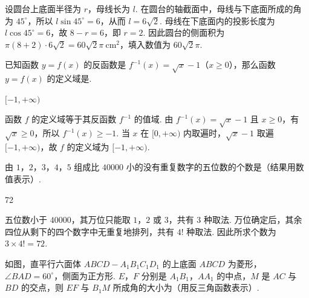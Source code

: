 \documentclass[UTF8,a4paper,oneside,11pt]{ctexbook}
\begin{document}
\begin{solution}
设圆台上底面半径为 \(r\)，母线长为 \(l\). 在圆台的轴截面中，母线与下底面所成的角为 \(45^\circ\)，所以 \(l\sin45^\circ=6\)，从而 \(l=6\sqrt{2}\). 母线在下底面内的投影长度为 \(l\cos45^\circ=6\)，故 \(8-r=6\)，即 \(r=2\). 因此圆台的侧面积为 \(\pi(8+2)\cdot6\sqrt{2}=60\sqrt{2}\pi\ \mathrm{cm}^2\)，填入数值为 \(60\sqrt{2}\pi\).
\end{solution}

\begin{problem}
已知函数 \(y = f(x)\) 的反函数是 \(f^{-1}(x)=\sqrt{x}-1\)（\(x \geqslant 0\)），那么函数 \(y = f(x)\) 的定义域是\fillinblank{}.
\end{problem}

\begin{answer}
\([-1,+\infty)\)
\end{answer}

\begin{solution}
函数 \(f\) 的定义域等于其反函数 \(f^{-1}\) 的值域. 由 \(f^{-1}(x)=\sqrt{x}-1\) 且 \(x\geqslant0\)，有 \(\sqrt{x}\geqslant0\)，所以 \(f^{-1}(x)\geqslant-1\). 当 \(x\) 在 \([0,+\infty)\) 内取遍时，\(\sqrt{x}-1\) 取遍 \([-1,+\infty)\)，故 \(f\) 的定义域为 \([-1,+\infty)\).
\end{solution}

\begin{problem}
由 \(1\)，\(2\)，\(3\)，\(4\)，\(5\) 组成比 \(40000\) 小的没有重复数字的五位数的个数是\fillinblank{}（结果用数值表示）.
\end{problem}

\begin{answer}
72
\end{answer}

\begin{solution}
五位数小于 \(40000\)，其万位只能取 \(1\)，\(2\) 或 \(3\)，共有 \(3\) 种取法. 万位确定后，其余四位从剩下的四个数字中无重复地排列，共有 \(4!\) 种取法. 因此所求个数为 \(3\times4!=72\).
\end{solution}

\begin{problem}
如图，直平行六面体 \(ABCD-A_1B_1C_1D_1\) 的上底面 \(ABCD\) 为菱形，\(\angle BAD = 60^\circ\)，侧面为正方形. \(E\)，\(F\) 分别是 \(A_1B_1\)，\(AA_1\) 的中点，\(M\) 是 \(AC\) 与 \(BD\) 的交点，则 \(EF\) 与 \(B_1M\) 所成角的大小为\fillinblank{}（用反三角函数表示）.

\end{problem}
\end{document}
